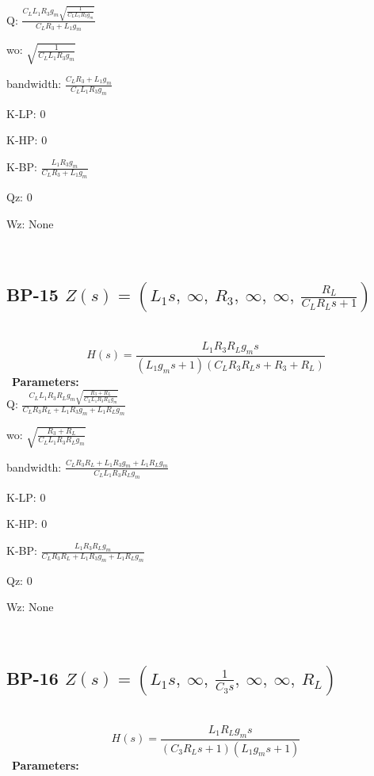 \documentclass{article}
\begin{document}
Q: $\frac{C_{L} L_{1} R_{3} g_{m} \sqrt{\frac{1}{C_{L} L_{1} R_{3} g_{m}}}}{C_{L} R_{3} + L_{1} g_{m}}$\ 

wo: $\sqrt{\frac{1}{C_{L} L_{1} R_{3} g_{m}}}$\ 

bandwidth: $\frac{C_{L} R_{3} + L_{1} g_{m}}{C_{L} L_{1} R_{3} g_{m}}$\ 

K-LP: $0$\ 

K-HP: $0$\ 

K-BP: $\frac{L_{1} R_{3} g_{m}}{C_{L} R_{3} + L_{1} g_{m}}$\ 

Qz: $0$\ 

Wz: $\text{None}$\ 

\ 

\subsection{BP-15 $Z(s) = \left( L_{1} s, \  \infty, \  R_{3}, \  \infty, \  \infty, \  \frac{R_{L}}{C_{L} R_{L} s + 1}\right)$ } \ 
\textbf{\[H(s) = \frac{L_{1} R_{3} R_{L} g_{m} s}{\left(L_{1} g_{m} s + 1\right) \left(C_{L} R_{3} R_{L} s + R_{3} + R_{L}\right)}\] } \ 
\textbf{Parameters:}\\ 

Q: $\frac{C_{L} L_{1} R_{3} R_{L} g_{m} \sqrt{\frac{R_{3} + R_{L}}{C_{L} L_{1} R_{3} R_{L} g_{m}}}}{C_{L} R_{3} R_{L} + L_{1} R_{3} g_{m} + L_{1} R_{L} g_{m}}$\ 

wo: $\sqrt{\frac{R_{3} + R_{L}}{C_{L} L_{1} R_{3} R_{L} g_{m}}}$\ 

bandwidth: $\frac{C_{L} R_{3} R_{L} + L_{1} R_{3} g_{m} + L_{1} R_{L} g_{m}}{C_{L} L_{1} R_{3} R_{L} g_{m}}$\ 

K-LP: $0$\ 

K-HP: $0$\ 

K-BP: $\frac{L_{1} R_{3} R_{L} g_{m}}{C_{L} R_{3} R_{L} + L_{1} R_{3} g_{m} + L_{1} R_{L} g_{m}}$\ 

Qz: $0$\ 

Wz: $\text{None}$\ 

\ 

\subsection{BP-16 $Z(s) = \left( L_{1} s, \  \infty, \  \frac{1}{C_{3} s}, \  \infty, \  \infty, \  R_{L}\right)$ } \ 
\textbf{\[H(s) = \frac{L_{1} R_{L} g_{m} s}{\left(C_{3} R_{L} s + 1\right) \left(L_{1} g_{m} s + 1\right)}\] } \ 
\textbf{Parameters:}\\ 
\end{document}
